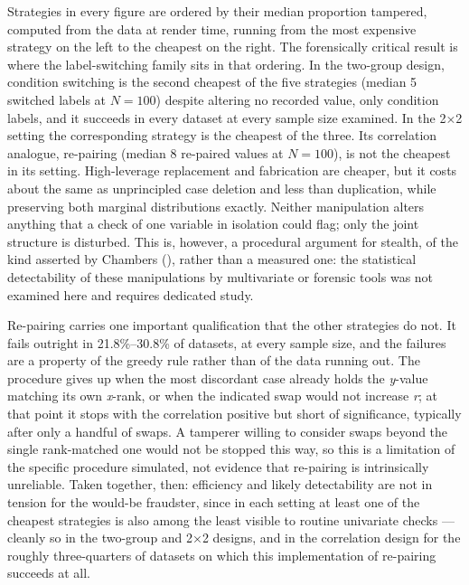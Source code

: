 \documentclass[
  nonatbib,
  authoryear,
  preprint]{elsarticle}
\begin{document}
Strategies in every figure are ordered by their median proportion
tampered, computed from the data at render time, running from the most
expensive strategy on the left to the cheapest on the right. The
forensically critical result is where the label-switching family sits in
that ordering. In the two-group design, condition switching is the
second cheapest of the five strategies (median 5 switched labels at
\(N = 100\)) despite altering no recorded value, only condition labels,
and it succeeds in every dataset at every sample size examined. In the
2×2 setting the corresponding strategy is the cheapest of the three. Its
correlation analogue, re-pairing (median 8 re-paired values at
\(N = 100\)), is not the cheapest in its setting. High-leverage
replacement and fabrication are cheaper, but it costs about the same as
unprincipled case deletion and less than duplication, while preserving
both marginal distributions exactly. Neither manipulation alters
anything that a check of one variable in isolation could flag; only the
joint structure is disturbed. This is, however, a procedural argument
for stealth, of the kind asserted by Chambers
(), rather than a measured one:
the statistical detectability of these manipulations by multivariate or
forensic tools was not examined here and requires dedicated study.

Re-pairing carries one important qualification that the other strategies
do not. It fails outright in 21.8\%--30.8\% of datasets, at every sample
size, and the failures are a property of the greedy rule rather than of
the data running out. The procedure gives up when the most discordant
case already holds the \emph{y}-value matching its own \emph{x}-rank, or
when the indicated swap would not increase \emph{r}; at that point it
stops with the correlation positive but short of significance, typically
after only a handful of swaps. A tamperer willing to consider swaps
beyond the single rank-matched one would not be stopped this way, so
this is a limitation of the specific procedure simulated, not evidence
that re-pairing is intrinsically unreliable. Taken together, then:
efficiency and likely detectability are not in tension for the would-be
fraudster, since in each setting at least one of the cheapest strategies
is also among the least visible to routine univariate checks --- cleanly
so in the two-group and 2×2 designs, and in the correlation design for
the roughly three-quarters of datasets on which this implementation of
re-pairing succeeds at all.
\end{document}
